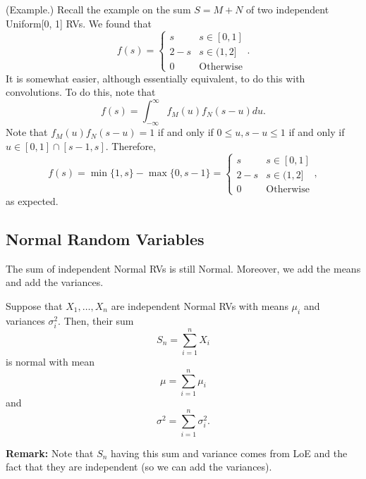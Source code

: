 \begin{mdframed}[]
    (Example.) Recall the example on the sum $S = M + N$ of two independent Uniform[0, 1] RVs. We found that 
    \[f(s) = \begin{cases}
        s & s \in [0, 1] \\ 
        2 - s & s \in (1, 2] \\ 
        0 & \text{Otherwise}
    \end{cases}.\]
    It is somewhat easier, although essentially equivalent, to do this with convolutions. To do this, note that 
    \[f(s) = \int_{-\infty}^{\infty} f_{M}(u) f_{N}(s - u) du.\]
    Note that $f_{M}(u) f_{N}(s - u) = 1$ if and only if $0 \leq u, s - u \leq 1$ if and only if $u \in [0, 1] \cap [s - 1, s]$. Therefore,
    \[f(s) = \min\{1, s\} - \max\{0, s - 1\} = \begin{cases}
        s & s \in [0, 1] \\ 
        2 - s & s \in (1, 2] \\ 
        0 & \text{Otherwise}
    \end{cases},\] 
    as expected.
\end{mdframed}

\subsection{Normal Random Variables}
The sum of independent Normal RVs is still Normal. Moreover, we add the means and add the variances. 

\begin{theorem}{}{}
    Suppose that $X_1, \dots, X_n$ are independent Normal RVs with means $\mu_i$ and variances $\sigma_i^2$. Then, their sum 
    \[S_n = \sum_{i = 1}^{n} X_i\]
    is normal with mean 
    \[\mu = \sum_{i = 1}^{n} \mu_i\]
    and 
    \[\sigma^2 = \sum_{i = 1}^{n} \sigma_{i}^2.\]
\end{theorem}
\textbf{Remark:} Note that $S_n$ having this sum and variance comes from LoE and the fact that they are independent (so we can add the variances). 